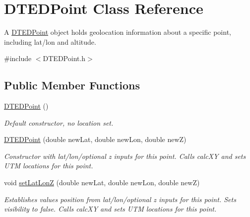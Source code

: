 \hypertarget{class_d_t_e_d_point}{
\section{DTEDPoint Class Reference}
\label{class_d_t_e_d_point}
}


A \hyperlink{class_d_t_e_d_point}{DTEDPoint} object holds geolocation information about a specific point, including lat/lon and altitude.  




{\ttfamily \#include $<$DTEDPoint.h$>$}

\subsection*{Public Member Functions}
\begin{DoxyCompactItemize}
\item 
\hyperlink{class_d_t_e_d_point_aa9c7dedffb89464ee39dd5f10121e5e8}{DTEDPoint} ()
\begin{DoxyCompactList}\small\item\em Default constructor, no location set. \end{DoxyCompactList}\item 
\hyperlink{class_d_t_e_d_point_abf7809035af5944f52f00d6fb1424b28}{DTEDPoint} (double newLat, double newLon, double newZ)
\begin{DoxyCompactList}\small\item\em Constructor with lat/lon/optional z inputs for this point. Calls calcXY and sets UTM locations for this point. \end{DoxyCompactList}\item 
void \hyperlink{class_d_t_e_d_point_a63d5c739997c463bfbe3b2106fcc582d}{setLatLonZ} (double newLat, double newLon, double newZ)
\begin{DoxyCompactList}\small\item\em Establishes values position from lat/lon/optional z inputs for this point. Sets visibility to false. Calls calcXY and sets UTM locations for this point. \end{DoxyCompactList}\end{DoxyCompactItemize}
